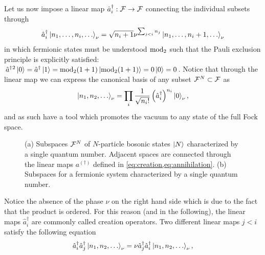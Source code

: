 Let us now impose a linear map $\hat a^\dag_i:\mathcal{F}\rightarrow\mathcal{F}$ connecting the individual subsets through
\begin{align}
    \hat a^\dag_i\ket{n_1,\dots,n_i,\dots}_\nu = \sqrt{n_i+1}\nu^{\sum_{j<i}n_j}\ket{n_1,\dots,n_i+1,\dots}_\nu
    \label{eq:creation}
\end{align}
in which fermionic states must be understood ${\rm mod}_2$ such that the Pauli exclusion principle is explicitly satisfied: $\hat a^\dag{}^2\ket{0}=\hat a^\dag\ket{1}={\rm mod}_2(1+1)\ket{{\rm mod}_2(1+1)} = 0\ket{0} = 0$.
Notice that through the linear map we can express the canonical basis of any subset $\mathcal{F}^N\subset\mathcal{F}$ as
\begin{align}
    \ket{n_1,n_2,\dots}_\nu = \prod_i\frac1{\sqrt{n_i!}}\left(\hat a^\dag_i\right)^{n_i}\ket{0}_\nu,
    \label{eq:Fock_basis}
\end{align}
and as such have a tool which promotes the vacuum to any state of the full Fock space.
\begin{figure}
    \centering
    \hfil
    \caption{(a) Subspaces $\mathcal{F}^N$ of $N$-particle bosonic states $\ket{N}$ characterized by a single quantum number. Adjacent spaces are connected through the linear maps $a^{(\dag)}$ defined in \cref{eq:creation,eq:annihilation}. (b) Subspaces for a fermionic system characterized by a single quantum number.}
    \label{fig:fock_spaces}
\end{figure}
Notice the absence of the phase $\nu$ on the right hand side which is due to the fact that the product is ordered.
For this reason (and in the following), the linear maps $\hat a^\dag_i$ are commonly called creation operators.
Two different linear maps $j<i$ satisfy the following equation
\begin{align}
    \hat a^\dag_i \hat a^\dag_j\ket{n_1,n_2,\dots}_\nu = \nu \hat a^\dag_j\hat a^\dag_i\ket{n_1,n_2,\dots}_\nu,
\end{align}
